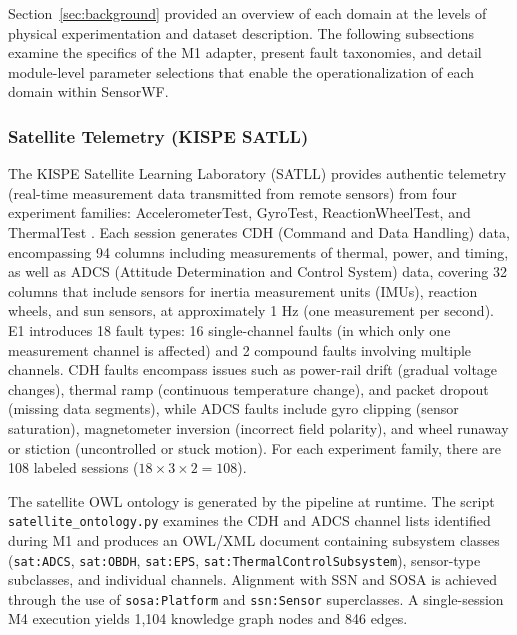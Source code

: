 \documentclass[conference]{IEEEtran}
\newcommand\Alex[1]{\leavevmode{\footnotesize\textbf{\hl{[Alex: #1]}}}}
\begin{document}
Section~\ref{sec:background} provided an overview of each domain at the levels of physical experimentation and dataset description. The following subsections examine the specifics of the M1 adapter, present fault taxonomies, and detail module-level parameter selections that enable the operationalization of each domain within SensorWF.


\subsubsection{Satellite Telemetry (KISPE SATLL)}

The KISPE Satellite Learning Laboratory (SATLL) provides authentic telemetry (real-time measurement data transmitted from remote sensors) from four experiment families: AccelerometerTest, GyroTest, ReactionWheelTest, and ThermalTest \cite{kispe_satll}. Each session generates CDH (Command and Data Handling) data, encompassing 94 columns including measurements of thermal, power, and timing, as well as ADCS (Attitude Determination and Control System) data, covering 32 columns that include sensors for inertia measurement units (IMUs), reaction wheels, and sun sensors, at approximately 1 Hz (one measurement per second). E1 introduces 18 fault types: 16 single-channel faults (in which only one measurement channel is affected) and 2 compound faults involving multiple channels. CDH faults encompass issues such as power-rail drift (gradual voltage changes), thermal ramp (continuous temperature change), and packet dropout (missing data segments), while ADCS faults include gyro clipping (sensor saturation), magnetometer inversion (incorrect field polarity), and wheel runaway or stiction (uncontrolled or stuck motion). For each experiment family, there are 108 labeled sessions ($18 \times 3 \times 2 = 108$).

The satellite OWL ontology is generated by the pipeline at runtime. The script \texttt{satellite\_ontology.py} examines the CDH and ADCS channel lists identified during M1 and produces an OWL/XML document containing subsystem classes (\texttt{sat:ADCS}, \texttt{sat:OBDH}, \texttt{sat:EPS}, \texttt{sat:ThermalControlSubsystem}), sensor-type subclasses, and individual channels. Alignment with SSN and SOSA is achieved through the use of \texttt{sosa:Platform} and \texttt{ssn:Sensor} superclasses. A single-session M4 execution yields 1,104 knowledge graph nodes and 846 edges.
\end{document}
